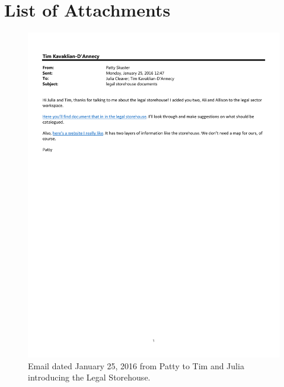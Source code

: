 \section*{List of Attachments}

\begin{figure}
   \centering
        \noindent\includegraphics[page=1,angle=-90,origin=c,width=.75\textwidth,height=.75\textheight]{documents/2016-01-25-Email-Patty.pdf} \hfill 
 \caption{Email dated January 25, 2016 from Patty to Tim and Julia introducing the Legal Storehouse.}
 \label{fig:2016-01-25-Email-Patty}
\end{figure}


